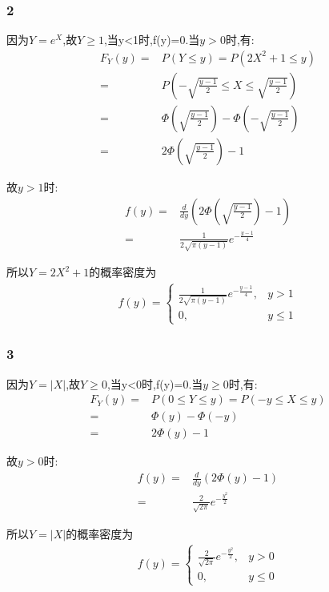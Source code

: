 \documentclass[12pt,a4paper,fontset=none]{ctexart}
\begin{document}
\subsubsection*{2}
因为$Y=e^X$,故$Y\geq 1$,当y<1时,f(y)=0.当$y>0$时,有:
\begin{align*}
    F_Y(y)= & P(Y\leq y)=P(2X^2+1\leq y) \\=&P(-\sqrt{\frac{y-1}{2} }\leq X\leq \sqrt{\frac{y-1}{2} })\\=&\varPhi(\sqrt{\frac{y-1}{2}})-\varPhi(-\sqrt{\frac{y-1}{2}})\\=&2\varPhi(\sqrt{\frac{y-1}{2}})-1
\end{align*}

故$y>1$时:
\begin{align*}
    f(y)= & \frac{d}{dy} (2\varPhi(\sqrt{\frac{y-1}{2}})-1) \\=&\frac{1}{2\sqrt{\pi(y-1)}}e^{-\frac{y-1}{4} }
\end{align*}

所以$Y=2X^2+1$的概率密度为
\begin{align*}
    f(y)=
    \begin{cases}
        \frac{1}{2\sqrt{\pi(y-1)}}e^{-\frac{y-1}{4} } , & y>1     \\
        0,                                              & y\leq 1
    \end{cases}
\end{align*}
\subsubsection*{3}
因为$Y=|X|$,故$Y\geq 0$,当y<0时,f(y)=0.当$y\geq 0$时,有:
\begin{align*}
    F_Y(y)= & P(0\leq Y\leq y)=P(-y\leq X\leq y) \\=&\varPhi(y)-\varPhi(-y)\\=&2\varPhi(y)-1
\end{align*}

故$y>0$时:
\begin{align*}
    f(y)= & \frac{d}{dy} (2\varPhi(y)-1) \\=&\frac{2}{\sqrt{2\pi}}e^{-\frac{y^2}{2} }
\end{align*}

所以$Y=|X|$的概率密度为
\begin{align*}
    f(y)=
    \begin{cases}
        \frac{2}{\sqrt{2\pi}}e^{-\frac{y^2}{2} } , & y>0     \\
        0,                                         & y\leq 0
    \end{cases}
\end{align*}
\end{document}
